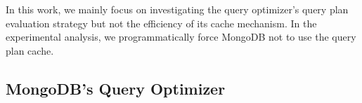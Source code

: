 In this work, we mainly focus on investigating the query optimizer's query plan evaluation strategy but not the efficiency of its cache mechanism. In the experimental analysis, we programmatically force MongoDB not to use the query plan cache. 

\subsection{MongoDB's \approachName Query Optimizer}

